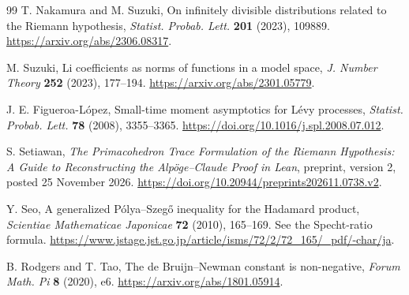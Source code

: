 \documentclass[11pt,a4paper]{article}
\theoremstyle{definition}
\theoremstyle{remark}
\numberwithin{equation}{section}
\begin{document}
\begin{thebibliography}{99}
T. Nakamura and M. Suzuki, On infinitely divisible distributions
related to the Riemann hypothesis,
\emph{Statist. Probab. Lett.} \textbf{201} (2023), 109889.
\url{https://arxiv.org/abs/2306.08317}.

M. Suzuki, Li coefficients as norms of functions in a model space,
\emph{J. Number Theory} \textbf{252} (2023), 177--194.
\url{https://arxiv.org/abs/2301.05779}.

J. E. Figueroa-L\'opez, Small-time moment asymptotics for L\'evy
processes, \emph{Statist. Probab. Lett.} \textbf{78} (2008), 3355--3365.
\url{https://doi.org/10.1016/j.spl.2008.07.012}.

S. Setiawan, \emph{The Primacohedron Trace Formulation of the Riemann
Hypothesis: A Guide to Reconstructing the Alp\"oge--Claude Proof in Lean},
preprint, version 2, posted 25 November 2026.
\url{https://doi.org/10.20944/preprints202611.0738.v2}.

Y. Seo, A generalized P\'olya--Szeg\H{o} inequality for the Hadamard
product, \emph{Scientiae Mathematicae Japonicae} \textbf{72} (2010),
165--169. See the Specht-ratio formula.
\url{https://www.jstage.jst.go.jp/article/isms/72/2/72_165/_pdf/-char/ja}.

B. Rodgers and T. Tao, The de Bruijn--Newman constant is non-negative,
\emph{Forum Math. Pi} \textbf{8} (2020), e6.
\url{https://arxiv.org/abs/1801.05914}.
\end{thebibliography}
\endgroup
\end{document}
